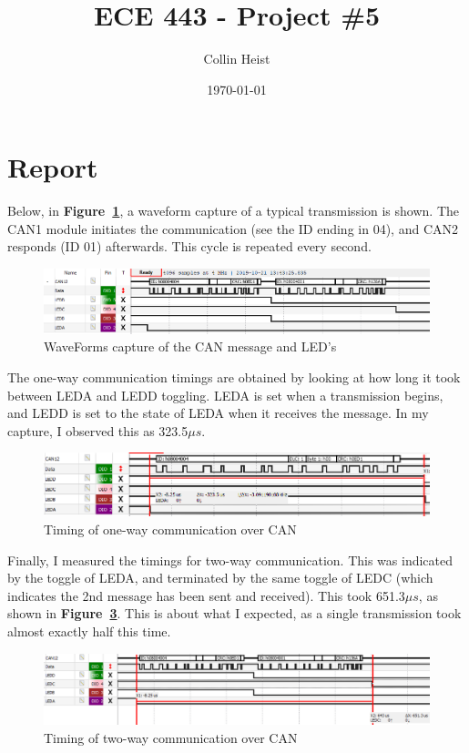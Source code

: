 \documentclass[a4paper, 12pt]{article}
\begin{document}
\title{ECE 443 - Project \#5}
\author{Collin Heist}
\date{\today}
\maketitle

\tableofcontents
\newpage
{}

\section{Report}
Below, in \textbf{Figure~\ref{fig:can-buttons}}, a waveform capture of a typical transmission is shown. The CAN1 module initiates the communication (see the ID ending in 04), and CAN2 responds (ID 01) afterwards. This cycle is repeated every second.
	
\begin{figure}[H]
\centering
\includegraphics[width=\textwidth]{fig-can-buttons.PNG}
\caption{WaveForms capture of the CAN message and LED's}
\label{fig:can-buttons}
\end{figure}

The one-way communication timings are obtained by looking at how long it took between LEDA and LEDD toggling. LEDA is set when a transmission begins, and LEDD is set to the state of LEDA when it receives the message.  In my capture, I observed this as 323.5$\mu s$. 

\begin{figure}[H]
\centering
\includegraphics[width=\textwidth]{fig-one-way.PNG}
\caption{Timing of one-way communication over CAN}
\label{fig:one-way}
\end{figure}

Finally, I measured the timings for two-way communication. This was indicated by the toggle of LEDA, and terminated by the same toggle of LEDC (which indicates the 2nd message has been sent and received). This took 651.3$\mu s$, as shown in \textbf{Figure~\ref{fig:two-way}}. This is about what I expected, as a single transmission took almost exactly half this time.

\begin{figure}[H]
\centering
\includegraphics[width=\textwidth]{fig-two-way.PNG}
\caption{Timing of two-way communication over CAN}
\label{fig:two-way}
\end{figure}
\end{document}
